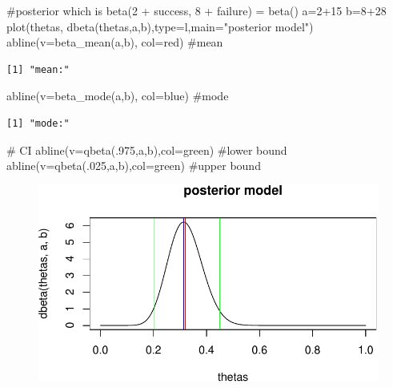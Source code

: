 \documentclass[
  letterpaper,
  DIV=11,
  numbers=noendperiod]{scrartcl}
\newenvironment{Shaded}{\begin{snugshade}}{\end{snugshade}}
\newcommand{\AttributeTok}[1]{\textcolor[rgb]{0.40,0.45,0.13}{#1}}
\newcommand{\CommentTok}[1]{\textcolor[rgb]{0.37,0.37,0.37}{#1}}
\newcommand{\DecValTok}[1]{\textcolor[rgb]{0.68,0.00,0.00}{#1}}
\newcommand{\FunctionTok}[1]{\textcolor[rgb]{0.28,0.35,0.67}{#1}}
\newcommand{\NormalTok}[1]{\textcolor[rgb]{0.00,0.23,0.31}{#1}}
\newcommand{\OtherTok}[1]{\textcolor[rgb]{0.00,0.23,0.31}{#1}}
\newcommand{\SpecialCharTok}[1]{\textcolor[rgb]{0.37,0.37,0.37}{#1}}
\newcommand{\StringTok}[1]{\textcolor[rgb]{0.13,0.47,0.30}{#1}}
\begin{document}
\begin{Shaded}
\begin{Highlighting}[]
\CommentTok{\#posterior which is beta(2 + success, 8 + failure) = beta()}
\NormalTok{a}\OtherTok{=}\DecValTok{2}\SpecialCharTok{+}\DecValTok{15}
\NormalTok{b}\OtherTok{=}\DecValTok{8}\SpecialCharTok{+}\DecValTok{28}
\FunctionTok{plot}\NormalTok{(thetas, }\FunctionTok{dbeta}\NormalTok{(thetas,a,b),}\AttributeTok{type=}\StringTok{\textquotesingle{}l\textquotesingle{}}\NormalTok{,}\AttributeTok{main=}\StringTok{"posterior model"}\NormalTok{)}
\FunctionTok{abline}\NormalTok{(}\AttributeTok{v=}\FunctionTok{beta\_mean}\NormalTok{(a,b), }\AttributeTok{col=}\StringTok{\textquotesingle{}red\textquotesingle{}}\NormalTok{) }\CommentTok{\#mean}
\end{Highlighting}
\end{Shaded}

\begin{verbatim}
[1] "mean:"
\end{verbatim}

\begin{Shaded}
\begin{Highlighting}[]
\FunctionTok{abline}\NormalTok{(}\AttributeTok{v=}\FunctionTok{beta\_mode}\NormalTok{(a,b), }\AttributeTok{col=}\StringTok{\textquotesingle{}blue\textquotesingle{}}\NormalTok{) }\CommentTok{\#mode}
\end{Highlighting}
\end{Shaded}

\begin{verbatim}
[1] "mode:"
\end{verbatim}

\begin{Shaded}
\begin{Highlighting}[]
\CommentTok{\# CI }
\FunctionTok{abline}\NormalTok{(}\AttributeTok{v=}\FunctionTok{qbeta}\NormalTok{(.}\DecValTok{975}\NormalTok{,a,b),}\AttributeTok{col=}\StringTok{\textquotesingle{}green\textquotesingle{}}\NormalTok{) }\CommentTok{\#lower bound }
\FunctionTok{abline}\NormalTok{(}\AttributeTok{v=}\FunctionTok{qbeta}\NormalTok{(.}\DecValTok{025}\NormalTok{,a,b),}\AttributeTok{col=}\StringTok{\textquotesingle{}green\textquotesingle{}}\NormalTok{) }\CommentTok{\#upper bound }
\end{Highlighting}
\end{Shaded}

\begin{figure}[H]

{\centering \includegraphics{hw2_602_files/figure-pdf/unnamed-chunk-7-3.pdf}

}

\end{figure}
\end{document}
